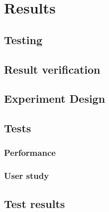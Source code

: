 \chapter{Results}
\section{Testing}

\section{Result verification}

\section{Experiment Design}

\section{Tests}

\subsection{Performance}

\subsection{User study}

\section{Test results}
